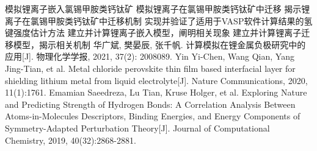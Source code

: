 \assignReq
{模拟锂离子嵌入氯锡甲胺类钙钛矿}
{模拟锂离子在氯锡甲胺类钙钛矿中迁移}
{揭示锂离子在氯锡甲胺类钙钛矿中迁移机制}
{}
{}
\assignWork
{实现并验证了适用于VASP软件计算结果的氢键强度估计方法}
{建立并计算锂离子嵌入模型，阐明相关现象}
{建立并计算锂离子迁移模型，揭示相关机制}
{}
{}
{}
\assignRef
{华广斌, 樊晏辰, 张千帆. 计算模拟在锂金属负极研究中的应用[J]. 物理化学学报, 2021, 37(2): 2008089.}
{Yin Yi-Chen, Wang Qian, Yang Jing-Tian, et al. Metal chloride perovskite thin film based interfacial
layer for shielding lithium metal from liquid electrolyte[J]. Nature Communications,
2020, 11(1):1761.}
{Emamian Saeedreza, Lu Tian, Kruse Holger, et al. Exploring Nature and Predicting Strength of Hydrogen Bonds: A Correlation Analysis Between Atoms-in-Molecules Descriptors, Binding Energies, and Energy Components of Symmetry-Adapted Perturbation Theory[J].
Journal of Computational Chemistry, 2019, 40(32):2868-2881.}
{}
{}
{}
{}
{}
